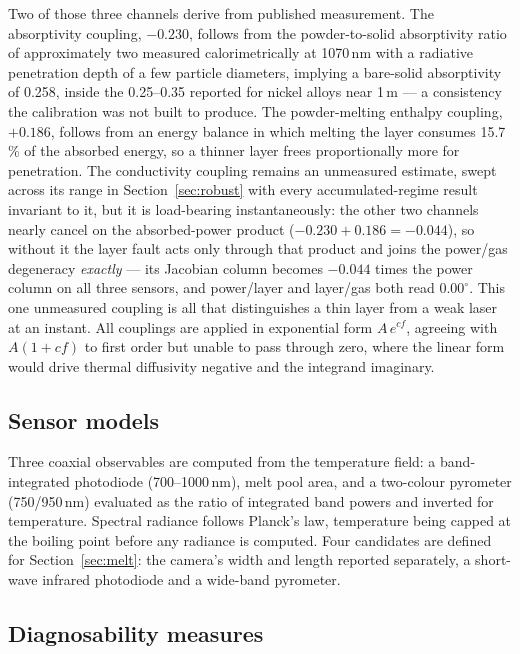 \documentclass[preprint,times]{elsarticle}
\begin{document}
Two of those three channels derive from published measurement. The absorptivity
coupling, $-0.230$, follows from the powder-to-solid absorptivity ratio of
approximately two measured calorimetrically at 1070\,nm \cite{Trapp2017} with a
radiative penetration depth of a few particle diameters, implying a bare-solid
absorptivity of 0.258, inside the 0.25--0.35 reported for nickel alloys near
1\,\textmu m --- a consistency the calibration was not built to produce. The powder-melting
enthalpy coupling, $+0.186$, follows from an energy balance in which melting the
layer consumes 15.7\,\% of the absorbed energy, so a thinner layer frees
proportionally more for penetration. The conductivity coupling remains an unmeasured estimate, swept across its range
in Section~\ref{sec:robust} with every accumulated-regime result invariant to it,
but it is load-bearing instantaneously: the other two channels nearly cancel on
the absorbed-power product ($-0.230+0.186=-0.044$), so without it the layer fault
acts only through that product and joins the power/gas degeneracy
\emph{exactly} --- its Jacobian column becomes $-0.044$ times the power column on
all three sensors, and power/layer and layer/gas both read $0.00^\circ$. This one
unmeasured coupling is all that distinguishes a thin layer from a weak laser at
an instant. All couplings are applied in exponential form $A\,e^{cf}$, agreeing with
$A(1+cf)$ to first order but unable to pass through zero, where the linear form
would drive thermal diffusivity negative and the integrand imaginary.

\subsection{Sensor models}

Three coaxial observables are computed from the temperature field: a
band-integrated photodiode (700--1000\,nm), melt pool area, and a two-colour
pyrometer (750/950\,nm) evaluated as the ratio of integrated band powers and
inverted for temperature. Spectral radiance follows Planck's law, temperature
being capped at the boiling point before any radiance is computed. Four
candidates are defined for Section~\ref{sec:melt}: the camera's width and length
reported separately, a short-wave infrared photodiode and a wide-band
pyrometer.

\subsection{Diagnosability measures}
\end{document}
